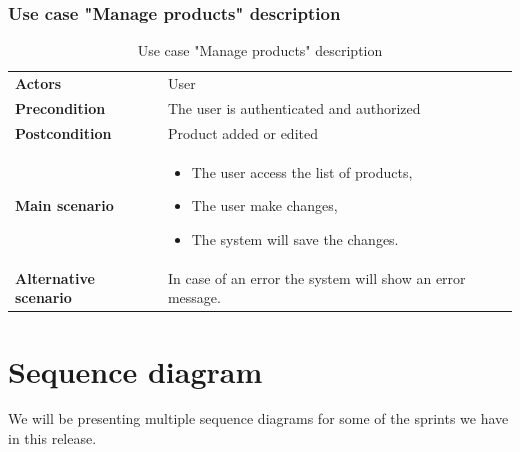 \documentclass[12pt,a4paper]{report}
\begin{document}
\subsubsection*{Use case "Manage products" description}
\begin{table}[H]
	\begin{center}
		\captionsetup[table]{skip=10pt}
		\caption{Use case "Manage products" description}
		\setlength\doublerulesep{0.5pt}
		\begin{tabular}{|  p{5cm}|  p{9cm}|}
			\rowcolor{LightCyan}
			
			\hline
			\multicolumn{2}{c}{Use case "Manage products"}\\
			\hline
			
			\textbf{Actors} &                        
			User 
			\\ \hline
			
			\textbf{Precondition} &                        
			The user is authenticated and authorized
			\\ \hline
			\textbf{Postcondition} &                        
			Product added or edited
			\\ \hline
			
			\textbf{Main scenario} &                   
			\begin{itemize}
				\item The user access the list of products,
				\item The user make changes,
				\item The system will save the changes.
			\end{itemize}
			
			
			\\ \hline
			
			\textbf{Alternative scenario} &                        
			In case of an error the system will show an error message.
			\\ \hline
			
			
		\end{tabular}
		
	\end{center}
	
\end{table}
\section{Sequence diagram}
We will be presenting multiple sequence diagrams for some of the sprints we have in this release.\par
\end{document}
